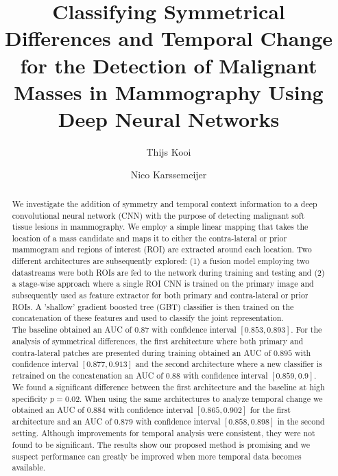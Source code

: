 \documentclass[12pt]{spieman}  %
\title{Classifying Symmetrical Differences and Temporal Change for the Detection of Malignant Masses in Mammography Using Deep Neural Networks}
\author[a, *]{Thijs Kooi}
\author[a]{Nico Karssemeijer}
\affil[a]{Diagnostic Image Analysis Group, Department of Radiology and Nuclear Medicine, RadboudUMC Nijmegen, The Netherlands}
\begin{document}
 
\maketitle


\begin{abstract}
  We investigate the addition of symmetry and temporal context information to a deep convolutional neural network (CNN) with the purpose of detecting malignant soft tissue lesions in mammography. We employ a simple linear mapping that takes the location of a mass candidate and maps it to either the contra-lateral or prior mammogram and regions of interest (ROI) are extracted around each location. Two different architectures are subsequently explored: (1) a fusion model employing two datastreams were both ROIs are fed to the network during training and testing and (2) a stage-wise approach where a single ROI CNN is trained on the primary image and subsequently used as feature extractor for both primary and contra-lateral or prior ROIs. A 'shallow' gradient boosted tree (GBT) classifier is then trained on the concatenation of these features and used to classify the joint representation. \\
  
  The baseline obtained an AUC of $0.87$ with confidence interval $[0.853, 0.893]$. For the analysis of symmetrical differences, the first architecture where both primary and contra-lateral patches are presented during training obtained an AUC of $0.895$ with confidence interval $[0.877, 0.913]$ and the second architecture where a new classifier is retrained on the concatenation an AUC of $0.88$ with confidence interval $[0.859, 0.9]$. We found a significant difference between the first architecture and the baseline at high specificity $p = 0.02$. When using the same architectures to analyze temporal change we obtained an AUC of $0.884$ with confidence interval $[0.865, 0.902]$ for the first architecture and an AUC of $0.879$ with confidence interval $[0.858, 0.898]$ in the second setting. Although improvements for temporal analysis were consistent, they were not found to be significant. The results show our proposed method is promising and we suspect performance can greatly be improved when more temporal data becomes available.
\end{abstract}

\end{document}
